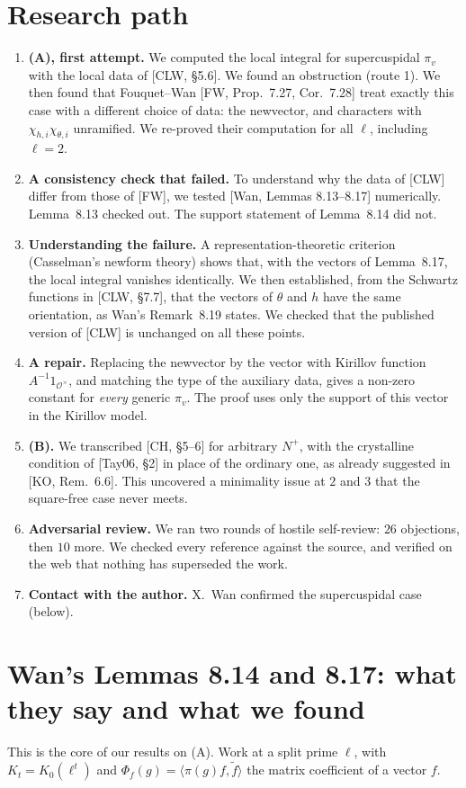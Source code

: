 \documentclass[11pt]{amsart}
\newcommand{\cO}{\mathcal{O}}
\begin{document}
\section{Research path}
\begin{enumerate}[label=\arabic*.]
\item \textbf{(A), first attempt.} We computed the local integral for supercuspidal $\pi_v$ with the local data of [CLW, \S5.6]. We found an obstruction (route 1). We then found that Fouquet--Wan [FW, Prop.~7.27, Cor.~7.28] treat exactly this case with a different choice of data: the newvector, and characters with $\chi_{h,i}\chi_{\theta,i}$ unramified. We re-proved their computation for all $\ell$, including $\ell=2$.
\item \textbf{A consistency check that failed.} To understand why the data of [CLW] differ from those of [FW], we tested [Wan, Lemmas 8.13--8.17] numerically. Lemma~8.13 checked out. The support statement of Lemma~8.14 did not.
\item \textbf{Understanding the failure.} A representation-theoretic criterion (Casselman's newform theory) shows that, with the vectors of Lemma~8.17, the local integral vanishes identically. We then established, from the Schwartz functions in [CLW, \S7.7], that the vectors of $\theta$ and $h$ have the same orientation, as Wan's Remark~8.19 states. We checked that the published version of [CLW] is unchanged on all these points.
\item \textbf{A repair.} Replacing the newvector by the vector with Kirillov function $A^{-1}1_{\cO^\times}$, and matching the type of the auxiliary data, gives a non-zero constant for \emph{every} generic $\pi_v$. The proof uses only the support of this vector in the Kirillov model.
\item \textbf{(B).} We transcribed [CH, \S5--6] for arbitrary $N^+$, with the crystalline condition of [Tay06, \S2] in place of the ordinary one, as already suggested in [KO, Rem.~6.6]. This uncovered a minimality issue at $2$ and $3$ that the square-free case never meets.
\item \textbf{Adversarial review.} We ran two rounds of hostile self-review: $26$ objections, then $10$ more. We checked every reference against the source, and verified on the web that nothing has superseded the work.
\item \textbf{Contact with the author.} X.~Wan confirmed the supercuspidal case (below).
\end{enumerate}


\section{Wan's Lemmas 8.14 and 8.17: what they say and what we found}
This is the core of our results on (A). Work at a split prime $\ell$, with $K_t=K_0(\ell^t)$ and $\Phi_f(g)=\langle\pi(g)f,\tilde f\rangle$ the matrix coefficient of a vector $f$.
\end{document}
